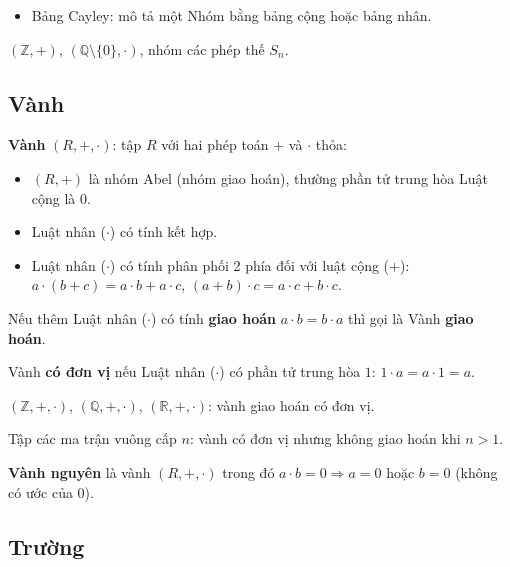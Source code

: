 \documentclass[12pt,a4paper]{article}
\begin{document}
\begin{luuy}
    \begin{itemize}
        \item Bảng Cayley: mô tả một Nhóm bằng bảng cộng hoặc bảng nhân.
    \end{itemize}
\end{luuy}

\begin{vidu}
  $(\mathbb{Z}, +)$, $(\mathbb{Q} \setminus \{0\}, \cdot)$, nhóm các phép thế $S_n$.
\end{vidu}

\subsection{Vành}

\begin{dinhnghia}
  \textbf{Vành} $(R, +, \cdot)$: tập $R$ với hai phép toán $+$ và $\cdot$ thỏa:
  \begin{itemize}
    \item $(R, +)$ là nhóm Abel (nhóm giao hoán), thường phần tử trung hòa Luật cộng là $0$.
    \item Luật nhân ($\cdot$) có tính kết hợp.
    \item Luật nhân ($\cdot$) có tính phân phối 2 phía đối với luật cộng ($+$): $a \cdot (b + c) = a \cdot b + a \cdot c$, $(a + b) \cdot c = a \cdot c + b \cdot c$.
  \end{itemize}
  Nếu thêm Luật nhân ($\cdot$) có tính \textbf{giao hoán} $a \cdot b = b \cdot a$ thì gọi là Vành \textbf{giao hoán}.
  
  Vành \textbf{có đơn vị} nếu Luật nhân ($\cdot$) có phần tử trung hòa $1$: $1 \cdot a = a \cdot 1 = a$.
\end{dinhnghia}

\begin{vidu}
  $(\mathbb{Z}, +, \cdot)$, $(\mathbb{Q}, +, \cdot)$, $(\mathbb{R}, +, \cdot)$: vành giao hoán có đơn vị. 
  
  Tập các ma trận vuông cấp $n$: vành có đơn vị nhưng không giao hoán khi $n > 1$.
\end{vidu}

\begin{dinhnghia}
  \textbf{Vành nguyên} là vành $(R, +, \cdot)$ trong đó $a \cdot b = 0 \Rightarrow a = 0$ hoặc $b = 0$ (không có ước của 0).
\end{dinhnghia}

\subsection{Trường}
\end{document}
